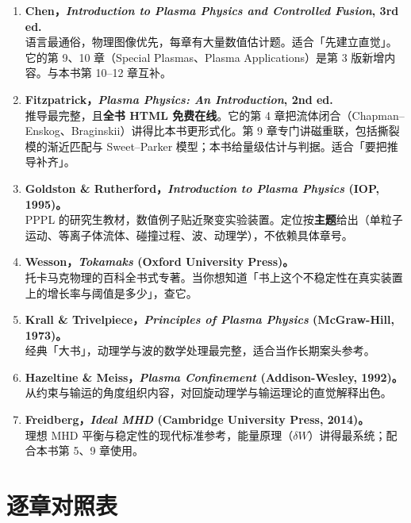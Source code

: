 \begin{enumerate}
\item \textbf{Chen，\textit{Introduction to Plasma Physics and Controlled Fusion}, 3rd ed.}\\
语言最通俗，物理图像优先，每章有大量数值估计题。适合「先建立直觉」。它的第 9、10 章（Special Plasmas、Plasma Applications）是第 3 版新增内容。与本书第 10--12 章互补。

\item \textbf{Fitzpatrick，\textit{Plasma Physics: An Introduction}, 2nd ed.}\\
推导最完整，且\textbf{全书 HTML 免费在线}。它的第 4 章把流体闭合（Chapman--Enskog、Braginskii）讲得比本书更形式化。第 9 章专门讲磁重联，包括撕裂模的渐近匹配与 Sweet--Parker 模型；本书给量级估计与判据。适合「要把推导补齐」。

\item \textbf{Goldston \& Rutherford，\textit{Introduction to Plasma Physics} (IOP, 1995)。}\\
PPPL 的研究生教材，数值例子贴近聚变实验装置。定位按\textbf{主题}给出（单粒子运动、等离子体流体、碰撞过程、波、动理学），不依赖具体章号。

\item \textbf{Wesson，\textit{Tokamaks} (Oxford University Press)。}\\
托卡马克物理的百科全书式专著。当你想知道「书上这个不稳定性在真实装置上的增长率与阈值是多少」，查它。

\item \textbf{Krall \& Trivelpiece，\textit{Principles of Plasma Physics} (McGraw-Hill, 1973)。}\\
经典「大书」，动理学与波的数学处理最完整，适合当作长期案头参考。

\item \textbf{Hazeltine \& Meiss，\textit{Plasma Confinement} (Addison-Wesley, 1992)。}\\
从约束与输运的角度组织内容，对回旋动理学与输运理论的直觉解释出色。

\item \textbf{Freidberg，\textit{Ideal MHD} (Cambridge University Press, 2014)。}\\
理想 MHD 平衡与稳定性的现代标准参考，能量原理（$\delta W$）讲得最系统；配合本书第 5、9 章使用。
\end{enumerate}


\section{逐章对照表}

